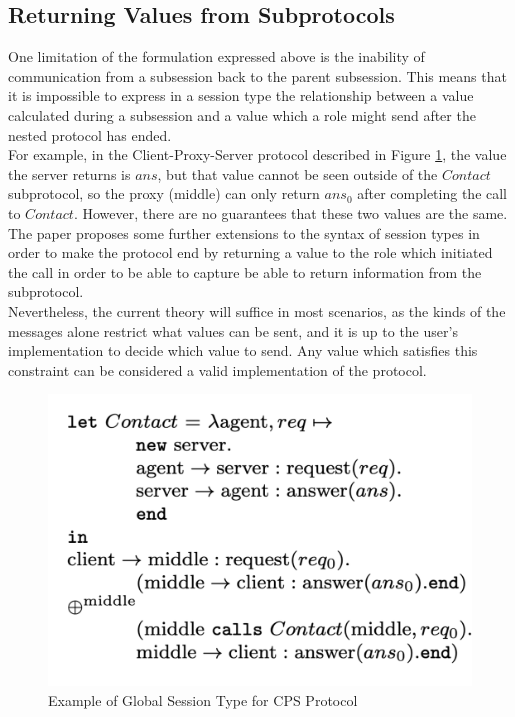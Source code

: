 \documentclass[12pt,twoside]{report}
\newcommand{\comment}[1]{}
\begin{document}
\subsection{Returning Values from Subprotocols}\label{nested-protocols-return-value}
One limitation of the formulation expressed above is the inability of communication from a subsession back to the parent subsession. This means that it is impossible to express in a session type the relationship between a value calculated during a subsession and a value which a role might send after the nested protocol has ended. \\

For example, in the Client-Proxy-Server protocol described in Figure \ref{nested_session_example}, the value the server returns is $ans$, but that value cannot be seen outside of the $Contact$ subprotocol, so the proxy (middle) can only return $ans_0$ after completing the call to $Contact$. However, there are no guarantees that these two values are the same. The paper proposes some further extensions to the syntax of session types in order to make the protocol end by returning a value to the role which initiated the call in order to be able to capture be able to return information from the subprotocol. \\

Nevertheless, the current theory will suffice in most scenarios, as the kinds of the messages alone restrict what values can be sent, and it is up to the user's implementation to decide which value to send. Any value which satisfies this constraint can be considered a valid implementation of the protocol.
\begin{figure}[h]
    \centering
    \includegraphics[scale=0.5]{nested_session_example.png}
    \caption{Example of Global Session Type for CPS Protocol\cite{nestedprotocols}\comment{nested protocols snippet}}
    \label{nested_session_example}
\end{figure}{}
\end{document}
